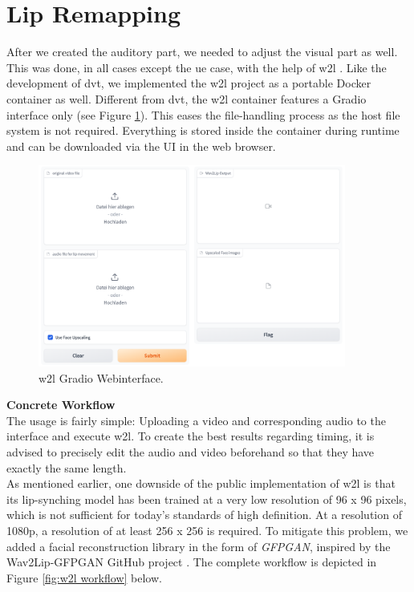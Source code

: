 \documentclass[
  a4paper,  %
  twoside,  %
  bibliography=totoc,
  headsepline,
  cleardoublepage=empty,
  parskip=half,
  draft=false
]{scrbook}
\begin{document}
\section{Lip Remapping}
 After we created the auditory part, we needed to adjust the visual part as well. This was done, in all cases except the \gls{ue} case, with the help of \gls{w2l} \cite{mukhopadhyayWav2LipAccuratelyLipsyncing2023}. Like the development of \gls{dvt}, we implemented the \gls{w2l} project as a portable Docker container as well. Different from \gls{dvt}, the \gls{w2l} container features a Gradio interface only (see Figure \ref{fig:w2l-gradio}). This eases the file-handling process as the host file system is not required. Everything is stored inside the container during runtime and can be downloaded via the UI in the web browser.
 \begin{figure}[h]

  \centering
  \includegraphics[width=0.9\textwidth]{./graphics/wav2lip/w2l-gradio.png}
  \caption{\gls{w2l} Gradio Webinterface.}
  \label{fig:w2l-gradio}
\end{figure}

\textbf{Concrete Workflow} \\
The usage is fairly simple: Uploading a video and corresponding audio to the interface and execute \gls{w2l}. To create the best results regarding timing, it is advised to precisely edit the audio and video beforehand so that they have exactly the same length. \\
As mentioned earlier, one downside of the public implementation of \gls{w2l} is that its lip-synching model has been trained at a very low resolution of 96 x 96 pixels, which is not sufficient for today's standards of high definition. At a resolution of 1080p, a resolution of at least 256 x 256 is required. To mitigate this problem, we added a facial reconstruction library in the form of \textit{GFPGAN}, inspired by the Wav2Lip-GFPGAN GitHub project \cite{sainyAjaysainyWav2LipGFPGAN2023}.
The complete workflow is depicted in Figure \ref{fig:w2l workflow} below.
\end{document}
